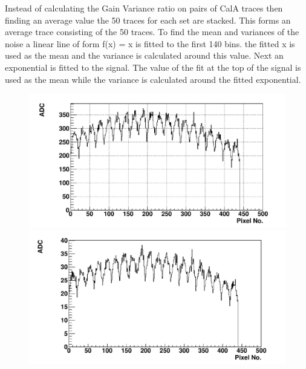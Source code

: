 Instead of calculating the Gain Variance ratio on pairs of CalA traces then finding an average value the 50 traces for each set are stacked. This forms an average trace consisting of the 50 traces. To find the mean and variances of the noise a linear line of form f(x) = x is fitted to the first 140 bins. the fitted x is used as the mean and the variance is calculated around this value. Next an exponential is fitted to the signal. The value of the fit at the top of the signal is used as the mean while the variance is calculated around the fitted exponential.  

\begin{figure} %
\includegraphics[width=\textwidth]{chapters/graphs/GainVarsMeas/LL_m04_2016-06-11/Set0and2/meanHist_StandHV_Average_set0and2.pdf}
\caption{}\label{fig:MeanVsPixel_StandardHV_Average}
\vspace{3mm}
\includegraphics[width=\textwidth]{chapters/graphs/GainVarsMeas/LL_m04_2016-06-11/Set0and2/meanHist_LowHV_Average_set0and2.pdf}
\caption{}\label{fig:MeanVsPixel_LowerHV_Average}
\end{figure}

